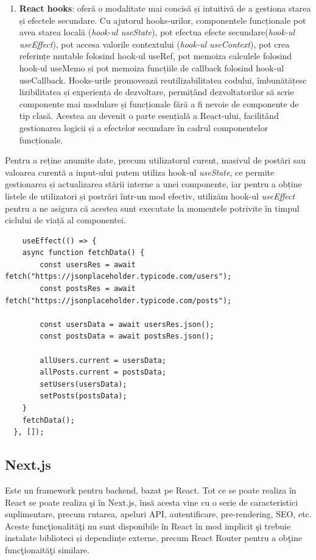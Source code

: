 \documentclass[12pt, a4paper]{report}
\begin{document}
\begin{enumerate}
	\item \textbf{React hooks}: oferă o modalitate mai concisă și intuitivă de a gestiona starea și efectele secundare. Cu ajutorul hooks-urilor, componentele funcționale pot avea starea locală (\textit{hook-ul useState}), pot efectua efecte secundare(\textit{hook-ul useEffect}), pot accesa valorile contextului (\textit{hook-ul useContext}), pot crea referințe mutable folosind hook-ul useRef, pot memoiza calculele folosind hook-ul useMemo și pot memoiza funcțiile de callback folosind hook-ul useCallback. Hooks-urile promovează reutilizabilitatea codului, îmbunătățesc lizibilitatea și experiența de dezvoltare, permițând dezvoltatorilor să scrie componente mai modulare și funcționale fără a fi nevoie de componente de tip clasă. Acestea au devenit o parte esențială a React-ului, facilitând gestionarea logicii și a efectelor secundare în cadrul componentelor funcționale.
\end{enumerate}

Pentru a reține anumite date, precum utilizatorul curent, masivul de postări sau valoarea curentă a input-ului putem utiliza hook-ul \emph{useState}, ce permite gestionarea și actualizarea stării interne a unei componente, iar pentru a obține listele de utilizatori și postrări într-un mod efectiv, utilizăm hook-ul \emph{useEffect} pentru a ne asigura că acestea sunt executate la momentele potrivite în timpul ciclului de viață al componentei.

\begin{lstlisting}
	useEffect(() => {
    async function fetchData() {
    	const usersRes = await fetch("https://jsonplaceholder.typicode.com/users");
    	const postsRes = await fetch("https://jsonplaceholder.typicode.com/posts");
      
		const usersData = await usersRes.json();
    	const postsData = await postsRes.json();

    	allUsers.current = usersData;
    	allPosts.current = postsData;
    	setUsers(usersData);
    	setPosts(postsData);
    }
    fetchData();
  }, []);
\end{lstlisting}

\subsection{Next.js}
Este un framework pentru backend, bazat pe React. Tot ce se poate realiza \^in React se poate realiza \c si \^in Next.js, \^ins\u a acesta vine cu o serie de caracteristici suplimentare, precum rutarea, apeluri API, autentificare, pre-rendering, SEO, etc. Aceste func\c tionalit\u a\c ti nu sunt disponibile în React în mod implicit \c si trebuie instalate biblioteci și dependințe externe, precum React Router pentru a ob\c tine func\c tionait\u a\c ti similare.
\end{document}
